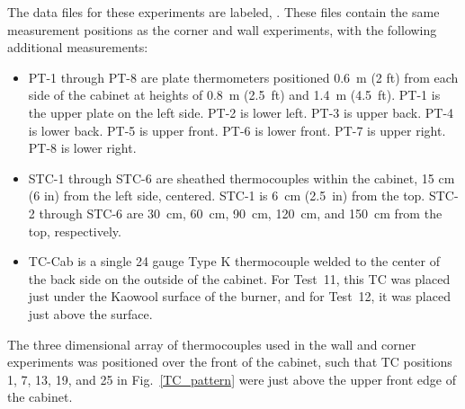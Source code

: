 The data files for these experiments are labeled, . These files contain the same measurement positions as the corner and wall experiments, with the following additional measurements:
\begin{itemize}
\item PT-1 through PT-8 are plate thermometers positioned 0.6~m (2 ft) from each side of the cabinet at heights of 0.8~m (2.5~ft) and 1.4~m (4.5~ft). PT-1 is the upper plate on the left side. PT-2 is lower left. PT-3 is upper back. PT-4 is lower back. PT-5 is upper front. PT-6 is lower front. PT-7 is upper right. PT-8 is lower right.
\item STC-1 through STC-6 are sheathed thermocouples within the cabinet, 15 cm (6 in) from the left side, centered. STC-1 is 6~cm (2.5~in) from the top. STC-2 through STC-6 are 30~cm, 60~cm, 90~cm, 120~cm, and 150~cm from the top, respectively.
\item TC-Cab is a single 24 gauge Type K thermocouple welded to the center of the back side on the outside of the cabinet. For Test~11, this TC was placed just under the Kaowool surface of the burner, and for Test~12, it was placed just above the surface.
\end{itemize}
The three dimensional array of thermocouples used in the wall and corner experiments was positioned over the front of the cabinet, such that TC positions 1, 7, 13, 19, and 25 in Fig.~\ref{TC_pattern} were just above the upper front edge of the cabinet.

